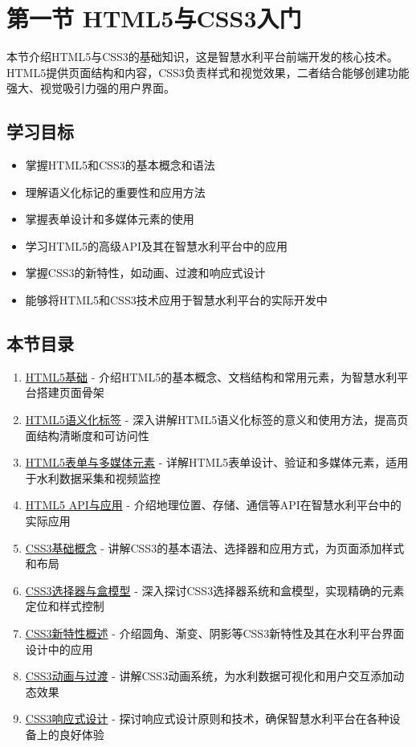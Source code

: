 \section{第一节
HTML5与CSS3入门}\label{ux7b2cux4e00ux8282-html5ux4e0ecss3ux5165ux95e8}

本节介绍HTML5与CSS3的基础知识，这是智慧水利平台前端开发的核心技术。HTML5提供页面结构和内容，CSS3负责样式和视觉效果，二者结合能够创建功能强大、视觉吸引力强的用户界面。

\subsection{学习目标}\label{ux5b66ux4e60ux76eeux6807}

\begin{itemize}
\tightlist
\item
  掌握HTML5和CSS3的基本概念和语法
\item
  理解语义化标记的重要性和应用方法
\item
  掌握表单设计和多媒体元素的使用
\item
  学习HTML5的高级API及其在智慧水利平台中的应用
\item
  掌握CSS3的新特性，如动画、过渡和响应式设计
\item
  能够将HTML5和CSS3技术应用于智慧水利平台的实际开发中
\end{itemize}

\subsection{本节目录}\label{ux672cux8282ux76eeux5f55}

\begin{enumerate}
\def\labelenumi{\arabic{enumi}.}
\tightlist
\item
  \href{section04-01-01.md}{HTML5基础} -
  介绍HTML5的基本概念、文档结构和常用元素，为智慧水利平台搭建页面骨架
\item
  \href{section04-01-02.md}{HTML5语义化标签} -
  深入讲解HTML5语义化标签的意义和使用方法，提高页面结构清晰度和可访问性
\item
  \href{section04-01-03.md}{HTML5表单与多媒体元素} -
  详解HTML5表单设计、验证和多媒体元素，适用于水利数据采集和视频监控
\item
  \href{section04-01-04.md}{HTML5 API与应用} -
  介绍地理位置、存储、通信等API在智慧水利平台中的实际应用
\item
  \href{section04-01-05.md}{CSS3基础概念} -
  讲解CSS3的基本语法、选择器和应用方式，为页面添加样式和布局
\item
  \href{section04-01-06.md}{CSS3选择器与盒模型} -
  深入探讨CSS3选择器系统和盒模型，实现精确的元素定位和样式控制
\item
  \href{section04-01-07.md}{CSS3新特性概述} -
  介绍圆角、渐变、阴影等CSS3新特性及其在水利平台界面设计中的应用
\item
  \href{section04-01-08.md}{CSS3动画与过渡} -
  讲解CSS3动画系统，为水利数据可视化和用户交互添加动态效果
\item
  \href{section04-01-09.md}{CSS3响应式设计} -
  探讨响应式设计原则和技术，确保智慧水利平台在各种设备上的良好体验
\end{enumerate}

